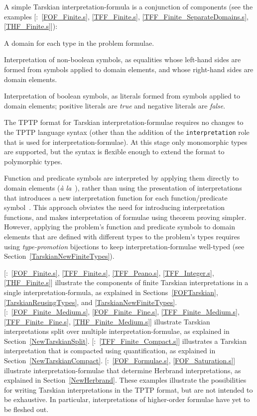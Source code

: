 \documentclass{easychair}
\newcommand{\smalltt}[1]{\small \texttt{#1}}
\newcommand{\example}{{\scriptsize \faFile[regular]}}
\newenvironment{packed_itemize}{
\vspace*{-0.3em}
\begin{itemize}
\setlength{\partopsep}{0pt}
\setlength{\itemsep}{1pt}
\setlength{\parskip}{0pt}
\setlength{\parsep}{0pt}
}{\end{itemize}}
\begin{document}
A simple Tarskian interpretation-formula is a conjunction of components
(see the examples [\example{}:~\ref{FOF_Finite.s}, \ref{TFF_Finite.s}, 
\ref{TFF_Finite_SeparateDomains.s}, \ref{THF_Finite.s}]):
\begin{packed_itemize}
\item A domain for each type in the problem formulae.
\item Interpretation of non-boolean symbols, as equalities whose left-hand sides are formed from 
      symbols applied to domain elements, and whose right-hand sides are domain elements.
\item Interpretation of boolean symbols, as literals formed from symbols applied to domain 
      elements; positive literals are \emph{true} and negative literals are \emph{false}.
\end{packed_itemize}
The TPTP format for Tarskian interpretation-formulae requires no changes to the TPTP
language syntax (other than the addition of the \smalltt{interpretation} role that is used for
interpretation-formulae).
At this stage only monomorphic types are supported, but the syntax is flexible enough to extend
the format to polymorphic types.

Function and predicate symbols are interpreted by applying them directly to domain elements 
(\emph{{\`a} la}~\cite[\S5.3.4]{Gal15}), rather than using the presentation of interpretations that 
introduces a new interpretation function for each function/predicate symbol~\cite[\S5.3.2]{Gal15}.
This approach obviates the need for introducing interpretation functions, and makes 
interpretation of formulae using theorem proving simpler.
However, applying the problem's function and predicate symbols to domain elements that are 
defined with different types to the problem's types requires using \emph{type-promotion} 
bijections to keep interpretation-formulae well-typed (see Section~\ref{TarskianNewFiniteTypes}).

[\example{}:~\ref{FOF_Finite.s}, \ref{TFF_Finite.s}, \ref{TFF_Peano.s}, \ref{TFF_Integer.s}, 
\ref{THF_Finite.s}] illustrate the components of finite Tarskian interpretations in a single 
interpretation-formula, as explained in Sections~\ref{FOFTarskian}, \ref{TarskianReusingTypes}, 
and \ref{TarskianNewFiniteTypes}.
[\example{}:~\ref{FOF_Finite_Medium.s}, \ref{FOF_Finite_Fine.s}, \ref{TFF_Finite_Medium.s}, 
\ref{TFF_Finite_Fine.s}, \ref{THF_Finite_Medium.s}] illustrate Tarskian interpretations split 
over multiple interpretation-formulae, as explained in Section~\ref{NewTarskianSplit}.
[\example{}:~\ref{TFF_Finite_Compact.s}] illustrates a Tarskian interpretation that is compacted 
using quantification, as explained in Section~\ref{NewTarskianCompact}.
[\example{}:~\ref{FOF_Formulae.s}, \ref{FOF_Saturation.s}] illustrate interpretation-formulae 
that determine Herbrand interpretations, as explained in Section~\ref{NewHerbrand}.
These examples illustrate the possibilities for writing Tarskian interpretations in the TPTP 
format, but are not intended to be exhaustive.
In particular, interpretations of higher-order formulae have yet to be fleshed out.
\end{document}
